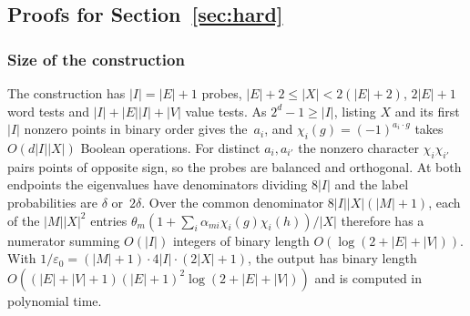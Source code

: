 
\subsection{Proofs for Section~\ref{sec:hard}}\label{app:hard-proofs}\label{app:ncl-proofs}

\subsubsection{Size of the construction}\label{app:ncl-size}

The construction has $|I|=|E|+1$ probes,
$|E|+2\le|X|<2(|E|+2)$, $2|E|+1$ word tests and $|I|+|E||I|+|V|$ value
tests. As $2^d-1\ge|I|$, listing $X$ and its first $|I|$ nonzero points in
binary order gives the~$a_i$, and $\chi_i(g)=(-1)^{a_i\cdot g}$ takes
$O(d|I||X|)$ Boolean operations. For
distinct $a_i,a_{i'}$ the nonzero character $\chi_i\chi_{i'}$ pairs points
of opposite sign, so the probes are balanced and orthogonal. At both
endpoints the eigenvalues have denominators dividing $8|I|$ and the label
probabilities are $\delta$ or~$2\delta$. Over the common denominator
$8|I||X|(|M|+1)$, each of the $|M||X|^2$ entries
$\theta_m(1+\sum_i\alpha_{mi}\chi_i(g)\chi_i(h))/|X|$ therefore has a
numerator summing $O(|I|)$ integers of binary length
$O(\log(2+|E|+|V|))$. With
$1/\varepsilon_0=(|M|+1)\cdot4|I|\cdot(2|X|+1)$, the output has binary
length $O((|E|+|V|+1)(|E|+1)^2\log(2+|E|+|V|))$ and is computed in
polynomial time.

